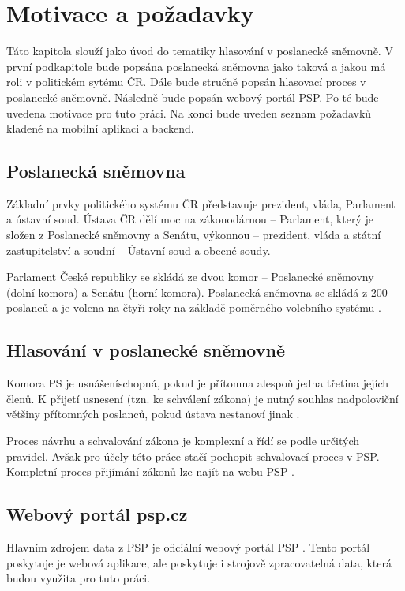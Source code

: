 \chapter{Motivace a požadavky}

\begin{chapterabstract}
Táto kapitola slouží jako úvod do tematiky hlasování v poslanecké sněmovně. V první podkapitole bude popsána poslanecká sněmovna jako taková a jakou má roli v politickém sytému ČR. Dále bude stručně popsán hlasovací proces v poslanecké sněmovně. Následně bude popsán webový portál PSP. Po té bude uvedena motivace pro tuto práci. Na konci bude uveden seznam požadavků kladené na mobilní aplikaci a backend.
\end{chapterabstract}

\section{Poslanecká sněmovna}
Základní prvky politického systému ČR představuje prezident, vláda, Parlament a ústavní soud. Ústava ČR dělí moc na zákonodárnou – Parlament, který je složen z Poslanecké sněmovny \linebreak a Senátu, výkonnou – prezident, vláda a státní zastupitelství a soudní – Ústavní soud a obecné soudy. \cite{Husek2019-p40}

Parlament České republiky se skládá ze dvou komor – Poslanecké sněmovny (dolní komora) \linebreak a Senátu (horní komora). Poslanecká sněmovna se skládá z 200 poslanců a je volena na čtyři roky na základě poměrného volebního systému \cite{Husek2019-p40}.

\section{Hlasování v poslanecké sněmovně}
Komora PS je usnášeníschopná, pokud je přítomna alespoň jedna třetina jejích členů. K přijetí usnesení (tzn. ke schválení zákona) je nutný souhlas nadpoloviční většiny přítomných poslanců, pokud ústava nestanoví jinak \cite{Husek2019-p40}.

Proces návrhu a schvalování zákona je komplexní a řídí se podle určitých pravidel. Avšak pro účely této práce stačí pochopit schvalovací proces v PSP. Kompletní proces přijímání zákonů lze najít na webu PSP \cite{psp-vote-process}.

\section{Webový portál psp.cz}
Hlavním zdrojem data z PSP je oficiální webový portál PSP \cite{psp}. Tento portál poskytuje je webová aplikace, ale poskytuje i strojově zpracovatelná data, která budou využita pro tuto práci.


